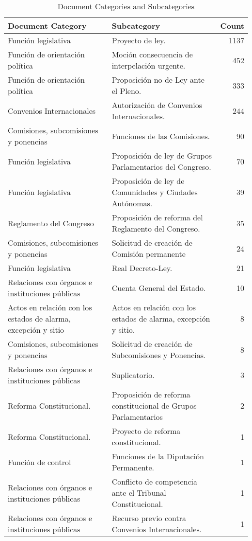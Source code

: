 \begin{table}
\caption{Document Categories and Subcategories}
\label{tab:document_categories}
\begin{tabular}{llr}
\toprule
Document Category & Subcategory & Count \\
\midrule
Función legislativa & Proyecto de ley. & 1137 \\
Función de orientación política & Moción consecuencia de interpelación urgente. & 452 \\
Función de orientación política & Proposición no de Ley ante el Pleno. & 333 \\
Convenios Internacionales & Autorización de Convenios Internacionales. & 244 \\
Comisiones, subcomisiones y ponencias & Funciones de las Comisiones. & 90 \\
Función legislativa & Proposición de ley de Grupos Parlamentarios del Congreso. & 70 \\
Función legislativa & Proposición de ley de Comunidades y Ciudades Autónomas. & 39 \\
Reglamento del Congreso & Proposición de reforma del Reglamento del Congreso. & 35 \\
Comisiones, subcomisiones y ponencias & Solicitud de creación de Comisión permanente & 24 \\
Función legislativa & Real Decreto-Ley. & 21 \\
Relaciones con órganos e instituciones públicas & Cuenta General del Estado. & 10 \\
Actos en relación con los estados de alarma, excepción y sitio & Actos en relación con los estados de alarma, excepción y sitio. & 8 \\
Comisiones, subcomisiones y ponencias & Solicitud de creación de Subcomisiones y Ponencias. & 8 \\
Relaciones con órganos e instituciones públicas & Suplicatorio. & 3 \\
Reforma Constitucional. & Proposición de reforma constitucional de Grupos Parlamentarios & 2 \\
Reforma Constitucional. & Proyecto de reforma constitucional. & 1 \\
Función de control & Funciones de la Diputación Permanente. & 1 \\
Relaciones con órganos e instituciones públicas & Conflicto de competencia ante el Tribunal Constitucional. & 1 \\
Relaciones con órganos e instituciones públicas & Recurso previo contra Convenios Internacionales. & 1 \\
\bottomrule
\end{tabular}
\end{table}

